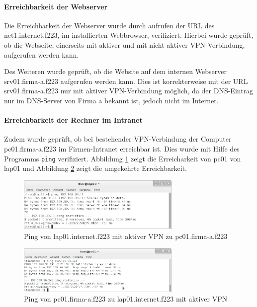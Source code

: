 \paragraph{Erreichbarkeit der Webserver}
Die Erreichbarkeit der Webserver wurde durch aufrufen der URL des net1.internet.f223, im installierten Webbrowser, verifiziert. Hierbei wurde geprüft, ob die Webseite, einerseits mit aktiver und mit nicht aktiver VPN-Verbindung, aufgerufen werden kann.

Des Weiteren wurde geprüft, ob die Website auf dem internen Webserver srv01.firma-a.f223 aufgerufen werden kann. Dies ist korrekterweise mit der URL srv01.firma-a.f223 nur mit aktiver VPN-Verbindung möglich, da der DNS-Eintrag nur im DNS-Server von Firma a bekannt ist, jedoch nicht im Internet.

\paragraph{Erreichbarkeit der Rechner im Intranet}
Zudem wurde geprüft, ob bei bestehender VPN-Verbindung der Computer pc01.firma-a.f223 im Firmen-Intranet erreichbar ist. Dies wurde mit Hilfe des Programms \texttt{ping} verifiziert. Abbildung \ref{vpn:lap01-ping-pc01} zeigt die Erreicharkeit von pc01 von lap01 und Abbildung \ref{vpn:pc01-ping-lap01} zeigt die umgekehrte Erreichbarkeit.

\begin{figure}[h!]
  \centering
    \includegraphics[width=0.7\textwidth]{figures/vpn_lap01_ping_pc01.png}
  \caption{Ping von lap01.internet.f223 mit aktiver VPN zu pc01.firma-a.f223}
  \label{vpn:lap01-ping-pc01}
\end{figure}

\begin{figure}[h!]
  \centering
    \includegraphics[width=0.7\textwidth]{figures/vpn_pc01_ping_lap01.png}
  \caption{Ping von pc01.firma-a.f223 zu lap01.internet.f223 mit aktiver VPN}
  \label{vpn:pc01-ping-lap01}
\end{figure}

